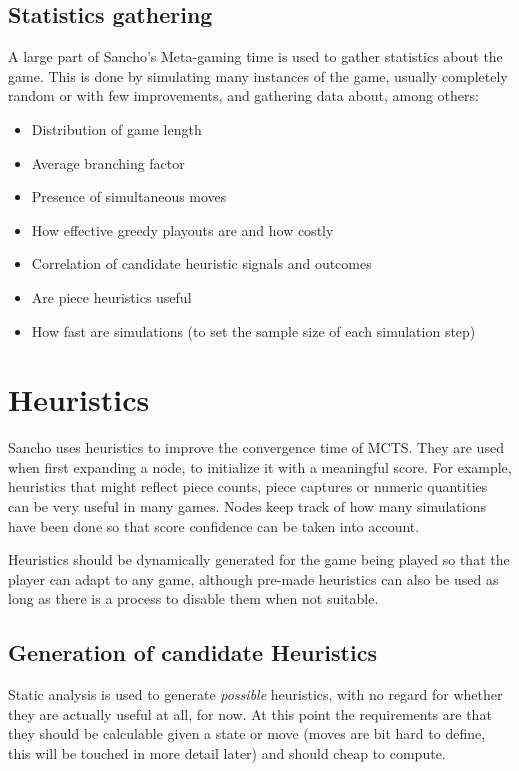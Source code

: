 \subsection{Statistics gathering}
\label{sssec:statistics_gathering}
A large part of Sancho's Meta-gaming time is used to gather statistics about the game. This is done by simulating many instances of the game, usually completely random or with few improvements, and gathering data about, among others:

\begin{itemize}
	\item Distribution of game length
	\item Average branching factor
	\item Presence of simultaneous moves
	\item How effective greedy playouts are and how costly
	\item Correlation of candidate heuristic signals and outcomes
	\item Are piece heuristics useful
	\item How fast are simulations (to set the sample size of each simulation step)
\end{itemize}

\section{Heuristics}
Sancho uses heuristics to improve the convergence time of MCTS. They are used when first expanding a node, to initialize it with a meaningful score. For example, heuristics that might reflect piece counts, piece captures or numeric quantities can be very useful in many games. Nodes keep track of how many simulations have been done so that score confidence can be taken into account. 

Heuristics should be dynamically generated for the game being played so that the player can adapt to any game, although pre-made heuristics can also be used as long as there is a process to disable them when not suitable.


\subsection{Generation of candidate Heuristics}
Static analysis is used to generate \textit{possible} heuristics, with no regard for whether they are actually useful at all, for now. At this point the requirements are that they should be calculable given a state or move (moves are bit hard to define, this will be touched in more detail later) and should cheap to compute.


